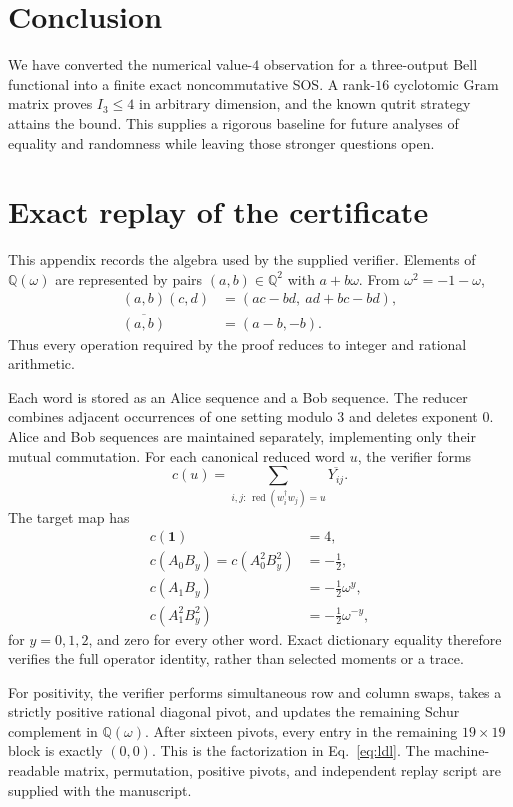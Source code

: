 \documentclass[aps,pra,reprint,superscriptaddress,nofootinbib,longbibliography]{revtex4-2}
\newcommand{\id}{\mathbf{1}}
\newcommand{\Q}{\mathbb{Q}}
\begin{document}
\section{Conclusion}

We have converted the numerical value-$4$ observation for a three-output Bell
functional into a finite exact noncommutative SOS.  A rank-$16$ cyclotomic Gram
matrix proves $I_3\leq4$ in arbitrary dimension, and the known qutrit strategy
attains the bound.  This supplies a rigorous baseline for future analyses of
equality and randomness while leaving those stronger questions open.

\appendix

\section{Exact replay of the certificate}

This appendix records the algebra used by the supplied verifier.  Elements of
$\Q(\omega)$ are represented by pairs $(a,b)\in\Q^2$ with
$a+b\omega$.  From $\omega^2=-1-\omega$,
\begin{align}
 (a,b)(c,d)&=(ac-bd,\ ad+bc-bd),\\
 \overline{(a,b)}&=(a-b,-b).
 \label{eq:field-arithmetic}
\end{align}
Thus every operation required by the proof reduces to integer and rational
arithmetic.

Each word is stored as an Alice sequence and a Bob sequence.  The reducer
combines adjacent occurrences of one setting modulo $3$ and deletes exponent
$0$.  Alice and Bob sequences are maintained separately, implementing only
their mutual commutation.  For each canonical reduced word $u$, the verifier
forms
\begin{equation}
 c(u)=\sum_{i,j:\,\operatorname{red}(w_i^\dagger w_j)=u}
 \overline{Y_{ij}}.
 \label{eq:coefficient-map}
\end{equation}
The target map has
\begin{align}
 c(\id)&=4,\\
 c(A_0B_y)=c(A_0^2B_y^2)&=-\tfrac12,\\
 c(A_1B_y)&=-\tfrac12\omega^y,\\
 c(A_1^2B_y^2)&=-\tfrac12\omega^{-y},
\end{align}
for $y=0,1,2$, and zero for every other word.  Exact dictionary equality
therefore verifies the full operator identity, rather than selected moments or
a trace.

For positivity, the verifier performs simultaneous row and column swaps, takes
a strictly positive rational diagonal pivot, and updates the remaining Schur
complement in $\Q(\omega)$.  After sixteen pivots, every entry in the remaining
$19\times19$ block is exactly $(0,0)$.  This is the factorization in
Eq.~\eqref{eq:ldl}.  The machine-readable matrix, permutation, positive pivots,
and independent replay script are supplied with the manuscript.
\end{document}
